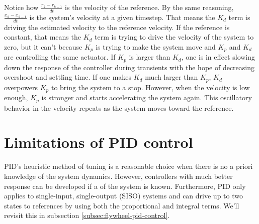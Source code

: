 Notice how $\frac{r_k - r_{k-1}}{dt}$ is the velocity of the reference. By the
same reasoning, $\frac{x_k - x_{k-1}}{dt}$ is the system's velocity at a given
timestep. That means the $K_d$ term is driving the estimated velocity to the
reference velocity. If the reference is constant, that means the $K_d$ term is
trying to drive the velocity of the system to zero, but it can't because $K_p$
is trying to make the system move and $K_p$ and $K_d$ are controlling the same
actuator. If $K_p$ is larger than $K_d$, one is in effect slowing down the
response of the controller during transients with the hope of decreasing
overshoot and settling time. If one makes $K_d$ much larger than $K_p$, $K_d$
overpowers $K_p$ to bring the system to a stop. However, when the velocity is
low enough, $K_p$ is stronger and starts accelerating the system again. This
oscillatory behavior in the velocity repeats as the system moves toward the
reference.

\section{Limitations of PID control}

PID's heuristic method of tuning is a reasonable choice when there is no a
priori knowledge of the \gls{system} dynamics. However, controllers with much
better response can be developed if a  of the
\gls{system} is known. Furthermore, PID only applies to single-input,
single-output (SISO) systems and can drive up to two \glspl{state} to
\glspl{reference} by using both the proportional and integral terms. We'll
revisit this in subsection \ref{subsec:flywheel-pid-control}.
